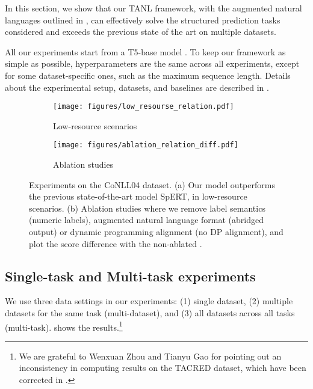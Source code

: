 In this section, we show that our TANL framework, with the augmented natural languages outlined in , can effectively solve the structured prediction tasks considered and exceeds the previous state of the art on multiple datasets. 

All our experiments start from a \pretrained T5-base model \citep{t5}. %
To keep our framework as simple as possible, hyperparameters are the same across all experiments, except for some dataset-specific ones, such as the maximum sequence length.
Details about the experimental setup, datasets, and baselines are described in .

\begin{figure*}[]
\vspace{-.3cm}
\centering
    \newcommand{\plotwidth}{0.48\textwidth}
  \begin{subfigure}[t]{\plotwidth}
    \texttt{[image: figures/low\_resourse\_relation.pdf]}
    \caption{Low-resource scenarios} \label{fig:low_resource_conll04_relation}
  \end{subfigure}
  \begin{subfigure}[t]{\plotwidth}
    \texttt{[image: figures/ablation\_relation\_diff.pdf]}
    \caption{Ablation studies }\label{fig:ablation_relation}
  \end{subfigure}
\vspace{-.2cm}
\caption{
Experiments on the CoNLL04 dataset.
(a) Our model outperforms the previous state-of-the-art 
model SpERT, in low-resource scenarios.
(b) Ablation studies where we remove label semantics (numeric labels), augmented natural language format (abridged output) or dynamic programming alignment (no DP alignment), and plot the score difference with the non-ablated \ourmodel{}.
}
\label{fig:low-resource-conll}
\vspace{-.4cm}
\end{figure*}

\subsection{Single-task and Multi-task experiments}  \label{sec:exp_singletask}  \label{sec:exp_multitask}
We use three data settings in our experiments: (1) single dataset, (2) multiple datasets for the same task (multi-dataset), and (3) all datasets across all tasks (multi-task).
 shows the results.\footnote{We are grateful to Wenxuan Zhou and Tianyu Gao for pointing out an inconsistency in computing results on the TACRED dataset, which have been corrected in .}

